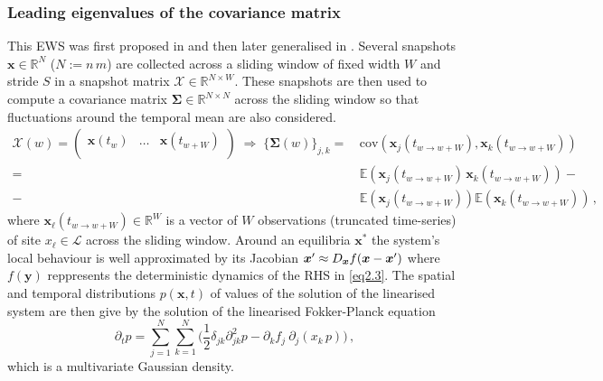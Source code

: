 \documentclass[../main.tex]{subfiles}
\begin{document}
\subsubsection{Leading eigenvalues of the covariance matrix}\label{subsubsec3.2.1}
This EWS was first proposed in \cite{Dakos18} and then later generalised in \cite{Chen19}. Several snapshots $\boldsymbol{x}\in \mathbb{R}^{N}$ ($N:=n\,m$) are collected across a sliding window of fixed width $W$ and stride $S$ in a snapshot matrix $\boldsymbol{\mathcal{X}}\in \mathbb{R}^{N\times W}$. 
These snapshots are then used to compute a covariance matrix $\boldsymbol{\Sigma}\in \mathbb{R}^{N\times N}$ across the sliding window so that fluctuations around the temporal mean are also considered.
\begin{align}
     \boldsymbol{\mathcal{X}}(w) = \begin{pmatrix}
                                        \boldsymbol{x}(t_{w}) & \dots & \boldsymbol{x}(t_{w + W}) \\
                                \end{pmatrix}	
                                \;\Rightarrow\;\Big\{\boldsymbol{\Sigma}(w)\Big\}_{j,k} =&\,\text{cov}(\boldsymbol{x}_{j}(t_{w\to w+W}), \boldsymbol{x}_{k}(t_{w\to w+W})) \nonumber \\
     =&\,\mathbb{E}(\boldsymbol{x}_{j}(t_{w\to w+W})\,\boldsymbol{x}_{k}(t_{w\to w+W})) - \nonumber \\
     -&\,\mathbb{E}(\boldsymbol{x}_{j}(t_{w\to w+W}))\mathbb{E}(\boldsymbol{x}_{k}(t_{w\to w+W}))\,, \label{eq2.4}
\end{align}
where $\boldsymbol{x}_{\ell}(t_{w\to w+W})\in \mathbb{R}^{W}$ is a vector of $W$ observations (truncated time-series) of site $x_{\ell}\in \mathcal{L}$ across the sliding window. Around an equilibria $\boldsymbol{x}^{*}$ the system's local behaviour is well approximated by its Jacobian $\boldsymbol{x}'\approx D_{\boldsymbol{x}}f(\boldsymbol{x}-\boldsymbol{x}')$ where $f(\boldsymbol{y})$ reppresents the deterministic dynamics of the RHS in \eqref{eq2.3}.
The spatial and temporal distributions $p(\boldsymbol{x},t)$ of values of the solution of the linearised system are then give by the solution of the linearised Fokker-Planck equation
\begin{equation}\label{eq2.5}
        \partial_{t}p = \sum_{j=1}^{N}\sum_{k=1}^{N}\Big(\frac{1}{2}\delta_{jk}\partial_{jk}^{2}p-\partial_{k}f_{j}\:\partial_{j}(x_{k}\,p)\Big)\,,
\end{equation}
which is a multivariate Gaussian density.
\end{document}

